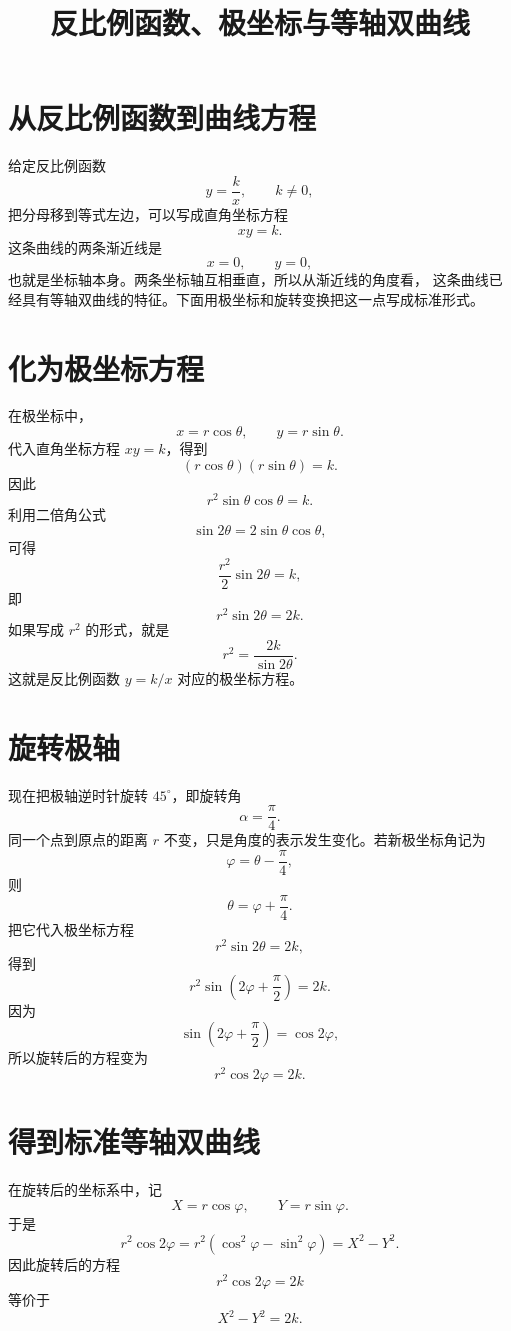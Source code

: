 \documentclass[UTF8]{ctexart}
\title{反比例函数、极坐标与等轴双曲线}
\author{}
\date{}
\begin{document}
\maketitle

\section{从反比例函数到曲线方程}

给定反比例函数
\[
  y=\frac{k}{x},\qquad k\ne 0,
\]
把分母移到等式左边，可以写成直角坐标方程
\[
  xy=k.
\]
这条曲线的两条渐近线是
\[
  x=0,\qquad y=0,
\]
也就是坐标轴本身。两条坐标轴互相垂直，所以从渐近线的角度看，
这条曲线已经具有等轴双曲线的特征。下面用极坐标和旋转变换把这一点写成标准形式。

\section{化为极坐标方程}

在极坐标中，
\[
  x=r\cos\theta,\qquad y=r\sin\theta.
\]
代入直角坐标方程 \(xy=k\)，得到
\[
  (r\cos\theta)(r\sin\theta)=k.
\]
因此
\[
  r^2\sin\theta\cos\theta=k.
\]
利用二倍角公式
\[
  \sin 2\theta=2\sin\theta\cos\theta,
\]
可得
\[
  \frac{r^2}{2}\sin 2\theta=k,
\]
即
\[
  r^2\sin 2\theta=2k.
\]
如果写成 \(r^2\) 的形式，就是
\[
  r^2=\frac{2k}{\sin 2\theta}.
\]
这就是反比例函数 \(y=k/x\) 对应的极坐标方程。

\section{旋转极轴}

现在把极轴逆时针旋转 \(45^\circ\)，即旋转角
\[
  \alpha=\frac{\pi}{4}.
\]
同一个点到原点的距离 \(r\) 不变，只是角度的表示发生变化。若新极坐标角记为
\[
  \varphi=\theta-\frac{\pi}{4},
\]
则
\[
  \theta=\varphi+\frac{\pi}{4}.
\]
把它代入极坐标方程
\[
  r^2\sin 2\theta=2k,
\]
得到
\[
  r^2\sin\left(2\varphi+\frac{\pi}{2}\right)=2k.
\]
因为
\[
  \sin\left(2\varphi+\frac{\pi}{2}\right)=\cos 2\varphi,
\]
所以旋转后的方程变为
\[
  r^2\cos 2\varphi=2k.
\]

\section{得到标准等轴双曲线}

在旋转后的坐标系中，记
\[
  X=r\cos\varphi,\qquad Y=r\sin\varphi.
\]
于是
\[
  r^2\cos 2\varphi
  =r^2(\cos^2\varphi-\sin^2\varphi)
  =X^2-Y^2.
\]
因此旋转后的方程
\[
  r^2\cos 2\varphi=2k
\]
等价于
\[
  X^2-Y^2=2k.
\]
\end{document}
